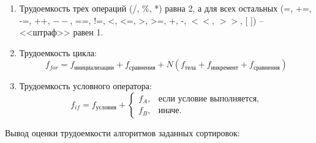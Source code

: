 \begin{enumerate}
    \item Трудоемкость трех операций (/, \%, *) равна 2, а для всех остальных (=, +=, -=, ++, $--$, ==, !=, <, <=, >, >=, +, -, $<<$, $>>$, [ ]) -- <<штраф>> равен 1.
    
    \item Трудоемкость цикла:
        \begin{equation}
            f_{for} = f_{\text{инициализации}} + f_{\text{сравнения}} + N(f_{\text{тела}} + f_{\text{инкремент}} + f_{\text{сравнения}})
        \end{equation}
        
    \item Трудоемкость условного оператора:
        \begin{equation}
           f_{if} = f_{\text{условия}} +
    		\begin{cases}
    			f_A, & \text{если условие выполняется,}\\
    			f_B, & \text{иначе.}
    		\end{cases} 
        \end{equation}
        
\end{enumerate}

\clearpage
Вывод оценки трудоемкости алгоритмов заданных сортировок:

